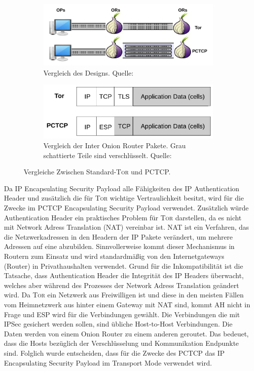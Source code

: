 \documentclass[fleqn,envcountsame,runningheads,10pt,a4paper]{llncs}
\begin{document}
\begin{figure}[b]
  \centering
  \begin{subfigure}[t]{0.46\textwidth}
    \includegraphics[width=\textwidth]{pics/PCTCP_design.pdf}
    \caption{Vergleich des Designs. Quelle: \cite{pctcp}}
    \label{fig:pctcpdesign}
  \end{subfigure}
  \begin{subfigure}[t]{0.46\textwidth}
    \includegraphics[width=\textwidth]{pics/PCTCP_header.pdf}
    \caption{Vergleich der Inter Onion Router Pakete. Grau schattierte Teile sind verschlüsselt. Quelle:\cite{pctcp}}
    \label{fig:pctcpheader}
  \end{subfigure}
  \caption{Vergleiche Zwischen Standard-\textsc{Tor} und PCTCP.}
\end{figure}

Da IP Encapsulating Security Payload alle Fähigkeiten des IP Authentication Header und zusätzlich die für \textsc{Tor} wichtige Vertraulichkeit besitzt, wird für die Zwecke im PCTCP Encapsulating Security Payload verwendet. Zusätzlich würde Authentication Header ein praktisches Problem für \textsc{Tor} darstellen, da es nicht mit Network Adress Translation (NAT) \cite{rfc:nat} vereinbar ist. NAT ist ein Verfahren, das die Netzwerkadressen in den  Headern der IP Pakete verändert, um mehrere Adressen auf eine abzubilden. Sinnvollerweise kommt dieser Mechanismus in Routern zum Einsatz und wird standardmäßig von den Internetgateways (Router) in Privathaushalten verwendet. Grund für die Inkompatibilität ist die Tatsache, dass Authentication Header die Integrität des IP Headers überwacht, welches aber während des Prozesses der Network Adress Translation geändert wird. Da \textsc{Tor} ein Netzwerk aus Freiwilligen ist und diese in den meisten Fällen vom Heimnetzwerk aus hinter einem Gateway mit NAT sind, kommt AH nicht in Frage und ESP wird für die Verbindungen gewählt. Die Verbindungen die mit IPSec gesichert werden sollen, sind übliche Host-to-Host Verbindungen. Die Daten werden von einem Onion Router zu einem anderen geroutet. Das bedeuet, dass die Hosts bezüglich der Verschlüsselung und Kommunikation Endpunkte sind. Folglich wurde entscheiden, dass für die Zwecke des PCTCP das IP Encapsulating Security Payload im Transport Mode verwendet wird.
\end{document}
